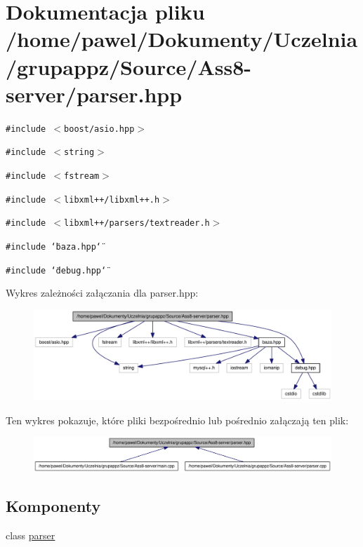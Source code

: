 \hypertarget{a00008}{
\section{Dokumentacja pliku /home/pawel/Dokumenty/Uczelnia/grupappz/Source/Ass8-server/parser.hpp}
\label{a00008}
}
{\tt \#include $<$boost/asio.hpp$>$}\par
{\tt \#include $<$string$>$}\par
{\tt \#include $<$fstream$>$}\par
{\tt \#include $<$libxml++/libxml++.h$>$}\par
{\tt \#include $<$libxml++/parsers/textreader.h$>$}\par
{\tt \#include \char`\"{}baza.hpp\char`\"{}}\par
{\tt \#include \char`\"{}debug.hpp\char`\"{}}\par


Wykres zależności załączania dla parser.hpp:\nopagebreak
\begin{figure}[H]
\begin{center}
\leavevmode
\includegraphics[width=339pt]{a00030}
\end{center}
\end{figure}


Ten wykres pokazuje, które pliki bezpośrednio lub pośrednio załączają ten plik:\nopagebreak
\begin{figure}[H]
\begin{center}
\leavevmode
\includegraphics[width=372pt]{a00031}
\end{center}
\end{figure}
\subsection*{Komponenty}
\begin{CompactItemize}
\item 
class \hyperlink{a00002}{parser}
\end{CompactItemize}
